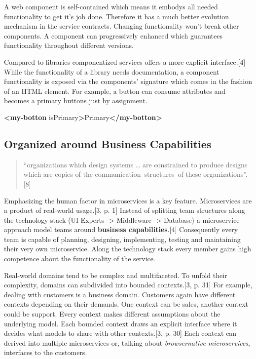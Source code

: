 \documentclass[]{assets/latex/ieee}
\newenvironment{Shaded}{}{}
\newcommand{\KeywordTok}[1]{\textcolor[rgb]{0.00,0.44,0.13}{\textbf{{#1}}}}
\newcommand{\OtherTok}[1]{\textcolor[rgb]{0.00,0.44,0.13}{{#1}}}
\newcommand{\NormalTok}[1]{{#1}}
\begin{document}
A web component is self-contained which means it embodys all needed
functionality to get it's job done. Therefore it has a much better
evolution mechanism in the service contracts. Changing functionality
won't break other components. A component can progressively enhanced
which guarantees functionality throughout different versions.

Compared to libraries componentized services offers a more explicit
interface.{[}4{]} While the functionality of a library needs
documentation, a component functionality is exposed via the components'
signature which comes in the fashion of an HTML element. For example, a
button can consume attributes and becomes a primary buttons just by
assignment.

\begin{Shaded}
\begin{Highlighting}[]
\KeywordTok{<my-botton}\OtherTok{ isPrimary}\KeywordTok{>}\NormalTok{Primary}\KeywordTok{</my-botton>}
\end{Highlighting}
\end{Shaded}

\subsection{Organized around Business
Capabilities}\label{organized-around-business-capabilities}

\begin{quote}
``organizations which design systems \ldots{} are constrained to produce
designs which are copies of the communication~structures~of these
organizations''. {[}8{]}
\end{quote}

Emphasizing the human factor in microservices is a key feature.
Microservices are a product of real-world usage.{[}3, p. 1{]} Instead of
splitting team structures along the technology stack (UI Experts
-\textgreater{} Middleware -\textgreater{} Database) a microservice
approach model teams around \textbf{business capabilities}.{[}4{]}
Consequently every team is capable of planning, designing, implementing,
testing and maintaining their very own microservice. Along the
technology stack every member gains high competence about the
functionality of the service.

Real-world domains tend to be complex and multifaceted. To unfold their
complexity, domains can subdivided into bounded contexts.{[}3, p. 31{]}
For example, dealing with customers is a business domain. Customers
again have different contexts depending on their demands. One context
can be sales, another context could be support. Every context makes
different assumptions about the underlying model. Each bounded context
draws an explicit interface where it decides what models to share with
other contexts.{[}3, p. 30{]} Each context can derived into multiple
microservices or, talking about \emph{browsernative microservices},
interfaces to the customers.
\end{document}
